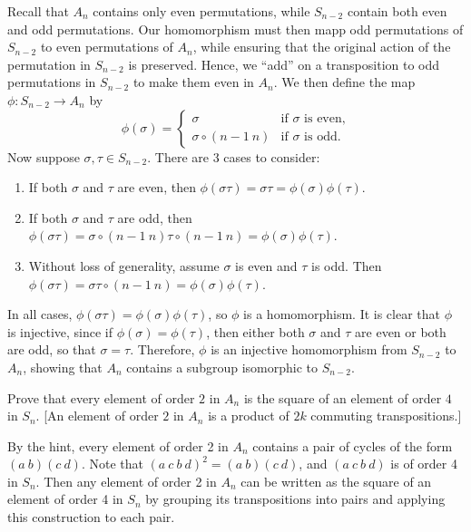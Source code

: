 \begin{sol}
    Recall that $A_n$ contains only even permutations, while $S_{n - 2}$ contain both even and odd permutations. Our homomorphism must then mapp odd permutations of $S_{n - 2}$ to even permutations of $A_n$, while ensuring that the original action of the permutation in $S_{n - 2}$ is preserved. Hence, we ``add'' on a transposition to odd permutations in $S_{n - 2}$ to make them even in $A_n$. We then define the map $\phi: S_{n - 2} \to A_n$ by
    \[\phi(\sigma) = 
    \begin{cases}
        \sigma & \text{if $\sigma$ is even,}\\
        \sigma \circ (n - 1\ n) & \text{if $\sigma$ is odd.}
    \end{cases}\]
    Now suppose $\sigma, \tau \in S_{n - 2}$. There are 3 cases to consider:
    \begin{enumerate}
        \item If both $\sigma$ and $\tau$ are even, then $\phi(\sigma\tau) = \sigma\tau = \phi(\sigma)\phi(\tau)$.
        \item If both $\sigma$ and $\tau$ are odd, then $\phi(\sigma\tau) = \sigma \circ (n - 1\ n)\tau \circ (n - 1\ n) = \phi(\sigma)\phi(\tau)$.
        \item Without loss of generality, assume $\sigma$ is even and $\tau$ is odd. Then $\phi(\sigma\tau) = \sigma\tau \circ (n - 1\ n) = \phi(\sigma)\phi(\tau)$.
    \end{enumerate}
    In all cases, $\phi(\sigma\tau) = \phi(\sigma)\phi(\tau)$, so $\phi$ is a homomorphism. It is clear that $\phi$ is injective, since if $\phi(\sigma) = \phi(\tau)$, then either both $\sigma$ and $\tau$ are even or both are odd, so that $\sigma = \tau$. Therefore, $\phi$ is an injective homomorphism from $S_{n - 2}$ to $A_n$, showing that $A_n$ contains a subgroup isomorphic to $S_{n - 2}$.
\end{sol}

\begin{exercise}\label{ex3.5.13}
    Prove that every element of order $2$ in $A_n$ is the square of an element of order $4$ in $S_n$. [An element of order $2$ in $A_n$ is a product of $2k$ commuting transpositions.]
\end{exercise}

\begin{sol}
    By the hint, every element of order 2 in $A_n$ contains a pair of cycles of the form $(a\ b)(c\ d)$. Note that $(a\ c\ b\ d)^2 = (a\ b)(c\ d)$, and $(a\ c\ b\ d)$ is of order 4 in $S_n$. Then any element of order 2 in $A_n$ can be written as the square of an element of order 4 in $S_n$ by grouping its transpositions into pairs and applying this construction to each pair.
\end{sol}

